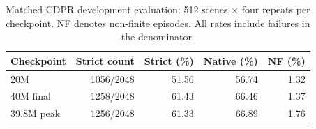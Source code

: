\begin{table}[t]
\caption{Matched CDPR development evaluation: 512 scenes $\times$ four repeats per checkpoint. NF denotes non-finite episodes. All rates include failures in the denominator.}
\label{tab:cdpr}\centering\small
\begin{tabular}{@{}lrrrr@{}}\toprule
Checkpoint & Strict count & Strict (\%) & Native (\%) & NF (\%)\\\midrule
20M & 1056/2048 & 51.56 & 56.74 & 1.32\\
40M final & 1258/2048 & 61.43 & 66.46 & 1.37\\
39.8M peak & 1256/2048 & 61.33 & 66.89 & 1.76\\\bottomrule
\end{tabular}
\end{table}
